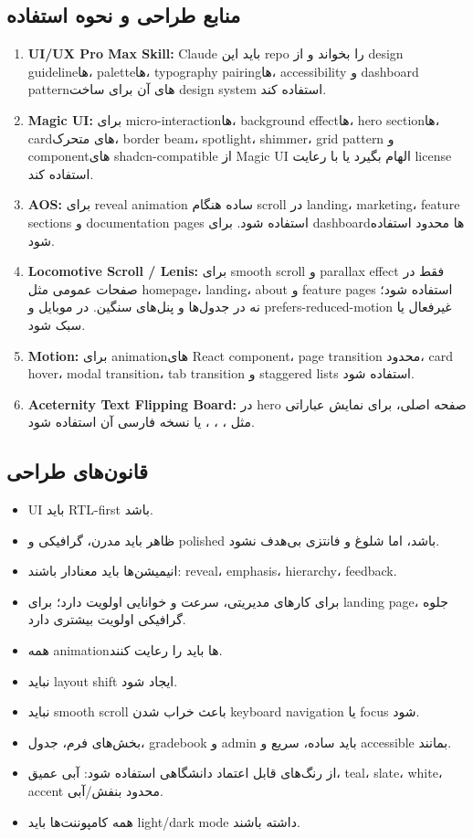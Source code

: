 \documentclass[12pt,a4paper]{article}
\newcommand{\code}[1]{\lr{\texttt{\detokenize{#1}}}}
\begin{document}
\subsection{منابع طراحی و نحوه استفاده}
\begin{enumerate}
  \item \textbf{UI/UX Pro Max Skill:} Claude باید این repo را بخواند و از design guidelineها، paletteها، typography pairingها، accessibility و dashboard patternهای آن برای ساخت design system استفاده کند.
  \item \textbf{Magic UI:} برای micro-interactionها، background effectها، hero sectionها، cardهای متحرک، border beam، spotlight، shimmer، grid pattern و componentهای shadcn-compatible از Magic UI الهام بگیرد یا با رعایت license استفاده کند.
  \item \textbf{AOS:} برای reveal animation ساده هنگام scroll در landing، marketing، feature sections و documentation pages استفاده شود. برای dashboardها محدود استفاده شود.
  \item \textbf{Locomotive Scroll / Lenis:} برای smooth scroll و parallax effect فقط در صفحات عمومی مثل homepage، landing، about و feature pages استفاده شود؛ نه در جدول‌ها و پنل‌های سنگین. در موبایل و prefers-reduced-motion غیرفعال یا سبک شود.
  \item \textbf{Motion:} برای animationهای React component، page transition محدود، card hover، modal transition، tab transition و staggered lists استفاده شود.
  \item \textbf{Aceternity Text Flipping Board:} در hero صفحه اصلی، برای نمایش عباراتی مثل ، ، ،  یا نسخه فارسی آن استفاده شود.
\end{enumerate}

\subsection{قانون‌های طراحی}
\begin{itemize}
  \item UI باید RTL-first باشد.
  \item ظاهر باید مدرن، گرافیکی و polished باشد، اما شلوغ و فانتزی بی‌هدف نشود.
  \item انیمیشن‌ها باید معنادار باشند: reveal، emphasis، hierarchy، feedback.
  \item برای کارهای مدیریتی، سرعت و خوانایی اولویت دارد؛ برای landing page، جلوه گرافیکی اولویت بیشتری دارد.
  \item همه animationها باید \code{prefers-reduced-motion} را رعایت کنند.
  \item نباید layout shift ایجاد شود.
  \item نباید smooth scroll باعث خراب شدن keyboard navigation یا focus شود.
  \item بخش‌های فرم، جدول، gradebook و admin باید ساده، سریع و accessible بمانند.
  \item از رنگ‌های قابل اعتماد دانشگاهی استفاده شود: آبی عمیق، teal، slate، white، accent محدود بنفش/آبی.
  \item همه کامپوننت‌ها باید light/dark mode داشته باشند.
\end{itemize}
\end{document}
